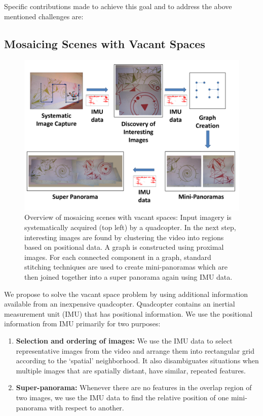 Specific contributions made to achieve this goal and to address the above
mentioned challenges are:\\

\subsection{Mosaicing Scenes with Vacant Spaces}
\begin{figure}[h!]
	\centering
	\includegraphics[width=0.98\linewidth]{figures/vacantSpaces/Workflow}
	\caption[Workflow]{ Overview of mosaicing scenes with vacant spaces: Input
	imagery is systematically acquired (top left) by a quadcopter.  In the next
    step, interesting images are found by clustering the video into
    regions based on positional data.  A graph is constructed using
    proximal images. For each connected component in a graph, standard
    stitching techniques are used to create mini-panoramas which are
    then joined together into a super panorama 
    again using IMU data.}
    \label{fig:vaccantSpaces_workflow} 
  \end{figure}
  
  We propose to solve the vacant space problem by using additional information
  available from an inexpensive quadcopter.  Quadcopter contains an inertial
measurement unit (IMU) that has positional information. We use the positional
information from IMU primarily for two purposes:
\begin{enumerate}
\item \textbf{Selection and ordering of images:}
We use the IMU data to select representative images from the video and arrange
them into rectangular grid according to the `spatial' neighborhood. It also
  disambiguates situations when multiple images that are spatially distant,
  have similar, repeated features.

\item \textbf{Super-panorama:} Whenever there are no features in
  the overlap region of two images, we use the IMU data to find the
  relative position of one mini-panorama with respect to another.
\end{enumerate}

